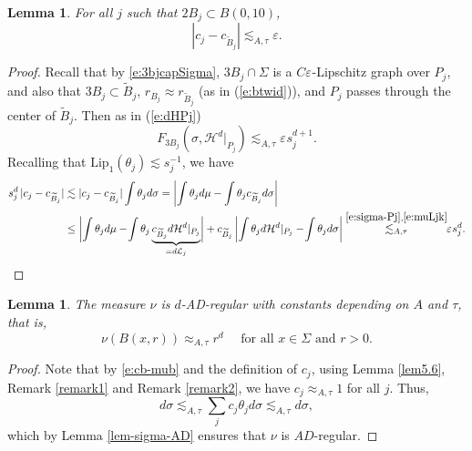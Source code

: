 \documentclass[11pt]{amsart}
\newcommand{\LL}{{\mathcal L}}
\newcommand{\rf}[1]{{(\ref{#1})}}
\newcommand{\ve}{{\varepsilon}}
\newcommand{\wt}[1]{{\widetilde{#1}}}
\newtheorem{lemma}[theorem]{Lemma}
\theoremstyle{definition}
\theoremstyle{remark}
\numberwithin{equation}{section}
\def\cH{{\mathcal{H}}}
\newcommand{\av}[1]{\left| #1 \right|}
\def\lec{\lesssim}
\def\lec{\lesssim}
\def\Lip{\textrm{Lip}}
\begin{document}
\begin{lemma}
	For all $j$ such that $2B_{j}\subset B(0,10)$,
	\begin{equation}\label{e:c-cB}
	|c_{j}-c_{\wt B_{j}}|\lec_{A,\tau} \ve .%
	\end{equation}
\end{lemma}

\begin{proof}
 
Recall that by \eqref{e:3bjcapSigma}, $3B_{j}\cap \Sigma$ is a $C\ve^{}$-Lipschitz graph over $P_{j}$, and also that $3B_j
\subset \wt B_j$, $r_{B_j}\approx r_{\wt B_j}$ (as in \rf{e:btwid}), and $P_j$ passes through the center of $\wt B_j$. Then 
as in \rf{e:dHPj}
\begin{equation}\label{e:sigma-Pj}
F_{3B_{j}}(\sigma,\cH^{d}|_{P_{j}})\lec_{A,\tau} \ve^{} s_{j}^{d+1} .
\end{equation}
Recalling that $\Lip_{1}(\theta_{j})\lec s_{j}^{-1}$, we have
\begin{align*}
s_{j}^{d} \,|c_{j}- c_{\wt{B}_{j}}| &  \lec  |c_{j}- c_{\wt{B}_{j}}|   \int \theta_{j}d\sigma 
= \av{ \int \theta_{j} d\mu -\int \theta_{j} c_{\wt{B}_{j}} d\sigma }\\
& \leq \biggl| \int \theta_{j} d\mu-\!\int \theta_{j} \underbrace{c_{\wt{B}_{j}} d\cH^{d}|_{P_{j}}}_{=d\LL_{j}}\biggr|
+c_{\wt{B}_{j}}   \av{\int \theta_{j} d\cH^{d}|_{P_{j}} -\! \int \theta_{j}d\sigma}
 \stackrel{\eqref{e:sigma-Pj}, \eqref{e:muLjk}}{\lec_{A,\tau} }\!\!
\ve^{} s_{j}^{d}.
\end{align*}
\end{proof}

\begin{lemma}
	The measure $\nu$ is $d$-AD-regular with constants depending on $A$ and $\tau$, that is,
	\begin{equation}
	\label{e:nu-AD}
	\nu(B(x,r))\approx_{A,\tau} r^{d} \quad\mbox{ for all }x\in \Sigma \mbox{ and }r>0.
	\end{equation}
\end{lemma}

\begin{proof}
	Note that by \eqref{e:cb-mub} and the definition of $c_{j}$, using Lemma \ref{lem5.6}, Remark \ref{remark1} and Remark \ref{remark2}, we have $c_{j}\approx_{A,\tau} 1$ for all $j$. Thus, 
	\begin{equation}\label{nu-sigma-comparison}
	d\sigma 
	\lec_{A,\tau} \sum_{j} c_{j} \theta_{j} d\sigma 
	\lec_{A,\tau} d\sigma,
	\end{equation}
	which by Lemma \ref{lem-sigma-AD} ensures that $\nu$ is $AD$-regular.
\end{proof}
\end{document}
